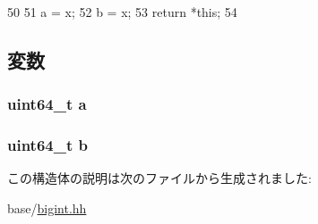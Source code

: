 \begin{DoxyCode}
50     {
51         a = x;
52         b = x;
53         return *this;
54     }
\end{DoxyCode}


\subsection{変数}
\hypertarget{structm5__twin64__t_a943da41846f7804fa8edd8b012551545}{
\subsubsection[{a}]{\setlength{\rightskip}{0pt plus 5cm}uint64\_\-t {\bf a}}}
\label{structm5__twin64__t_a943da41846f7804fa8edd8b012551545}
\hypertarget{structm5__twin64__t_ad66453096871179e6c6effe0df4b483b}{
\subsubsection[{b}]{\setlength{\rightskip}{0pt plus 5cm}uint64\_\-t {\bf b}}}
\label{structm5__twin64__t_ad66453096871179e6c6effe0df4b483b}


この構造体の説明は次のファイルから生成されました:\begin{DoxyCompactItemize}
\item 
base/\hyperlink{bigint_8hh}{bigint.hh}\end{DoxyCompactItemize}

